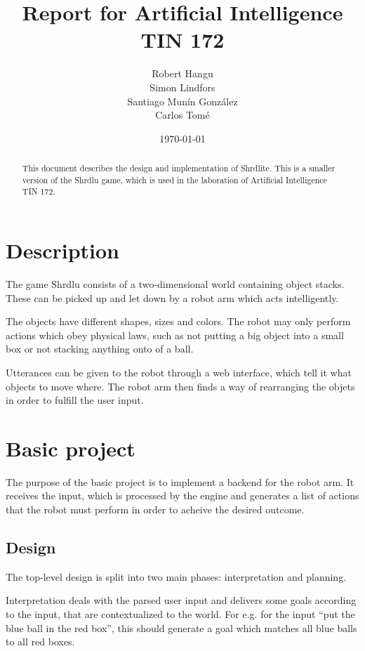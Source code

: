 \documentclass[11pt]{article}
\title{Report for Artificial Intelligence TIN 172}
\author{Robert Hangu\\\And
  Simon Lindfors\\\And
  Santiago Munín González\\\And
  Carlos Tomé
   }
\date{\today}
\begin{document}
	\maketitle
	\begin{abstract}

		This document describes the design and implementation of Shrdlite. This 
		is a smaller version of the Shrdlu game, which is used in the 
		laboration of Artificial Intelligence TIN 172.

	\end{abstract}

	\section{Description}
	
	The game Shrdlu consists of a two-dimensional world containing object 
	stacks. These can be picked up and let down by a robot arm which acts 
	intelligently. 

	The objects have different shapes, sizes and colors. The robot may only 
	perform actions which obey physical laws, such as not putting a big object 
	into a small box or not stacking anything onto of a ball.

	Utterances can be given to the robot through a web interface, which tell it 
	what objects to move where. The robot arm then finds a way of rearranging 
	the objets in order to fulfill the user input.

	\section{Basic project}

	The purpose of the basic project is to implement a backend for the robot 
	arm. It receives the input, which is processed by the engine and 
	generates a list of actions that the robot must perform in order to acheive 
	the desired outcome.
	
	\subsection{Design}

	The top-level design is split into two main phases: interpretation and 
	planning.

	Interpretation deals with the parsed user input and delivers some goals 
	according to the input, that are contextualized to the world. For e.g. for the 
	input ``put the blue ball in the red box'', this should generate a goal 
	which matches all blue balls to all red boxes.
	
\end{document}
